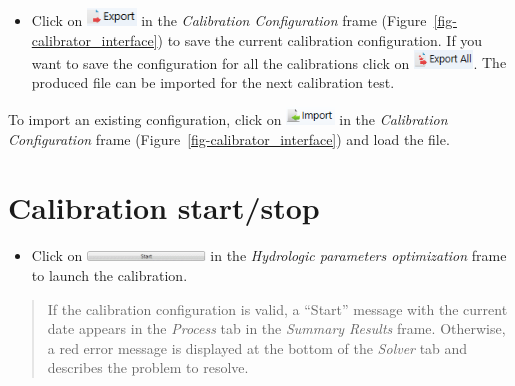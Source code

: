 \documentclass[
  letterpaper,
  DIV=11,
  numbers=noendperiod]{scrreprt}
\providecommand{\tightlist}{%
  \setlength{\itemsep}{0pt}\setlength{\parskip}{0pt}}\usepackage{longtable,booktabs,array}
\begin{document}
\begin{itemize}
\tightlist
\item
  {Click on
  \includegraphics[width=\textwidth,height=0.19in]{./figures/fig-icon_calibrator_export_config.png}
  in the \emph{Calibration Configuration} frame
  (Figure~\ref{fig-calibrator_interface}) to save the current
  calibration configuration. If you want to save the configuration for
  all the calibrations click on
  \includegraphics[width=\textwidth,height=0.19in]{./figures/fig-icon_calibrator_export_all_config.png}.}
  The produced file can be imported for the next calibration test.
\end{itemize}

{To import an existing configuration, click on
\includegraphics[width=\textwidth,height=0.19in]{./figures/fig-icon_calibrator_import_config.png}
in the \emph{Calibration Configuration} frame
(Figure~\ref{fig-calibrator_interface}) and load the file.}

\hypertarget{calibration-startstop}{%
\section{Calibration start/stop}\label{calibration-startstop}}

\begin{itemize}
\tightlist
\item
  {Click on
  \includegraphics[width=\textwidth,height=0.11in]{./figures/fig-icon_calibrator_start.png}
  in the \emph{Hydrologic parameters optimization} frame to launch the
  calibration.}
\end{itemize}

\begin{quote}
If the calibration configuration is valid, a ``Start'' message with the
current date appears in the \emph{Process} tab in the \emph{Summary
Results} frame. Otherwise, a red error message is displayed at the
bottom of the \emph{Solver} tab and describes the problem to resolve.
\end{quote}
\end{document}
